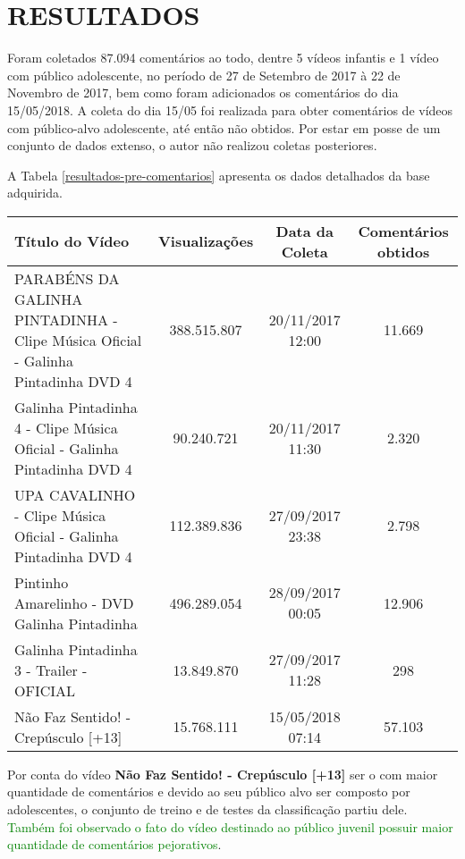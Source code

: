 \section{RESULTADOS}

Foram coletados 87.094 comentários ao todo, dentre 5 vídeos infantis e 1 vídeo com público adolescente, no período de 27 de Setembro de 2017 à 22 de Novembro de 2017, bem como foram adicionados os comentários do dia 15/05/2018. 
A coleta do dia 15/05 foi realizada para obter comentários de vídeos com público-alvo adolescente, até então não obtidos. Por estar em posse de um conjunto de dados extenso, o autor não realizou coletas posteriores. %

A Tabela \ref{resultados-pre-comentarios} apresenta os dados detalhados da base adquirida.

\begin{table}[H]
	
\begin{tabular}{|p{5.5cm}|c|c|c|}
\hline
\textbf{Título do Vídeo} & \textbf{Visualizações} & \textbf{Data da Coleta} & \textbf{Comentários obtidos} \\ \hline
PARABÉNS DA GALINHA PINTADINHA - Clipe Música Oficial - Galinha Pintadinha DVD 4 & 388.515.807 & 20/11/2017 12:00 & 11.669 \\ \hline
Galinha Pintadinha 4 - Clipe Música Oficial - Galinha Pintadinha DVD 4 & 90.240.721 & 20/11/2017 11:30 & 2.320 \\ \hline
UPA CAVALINHO - Clipe Música Oficial - Galinha Pintadinha DVD 4 & 112.389.836 & 27/09/2017 23:38 & 2.798 \\ \hline
Pintinho Amarelinho - DVD Galinha Pintadinha & 496.289.054 & 28/09/2017 00:05 & 12.906 \\ \hline
Galinha Pintadinha 3 - Trailer - OFICIAL & 13.849.870 & 27/09/2017 11:28 & 298 \\ \hline
Não Faz Sentido! - Crepúsculo [+13] & 15.768.111 & 15/05/2018 07:14 & 57.103 \\ \hline
\end{tabular}

\end{table}

Por conta do vídeo \textbf{Não Faz Sentido! - Crepúsculo [+13]} ser o com maior quantidade de comentários e devido ao seu público alvo ser composto por adolescentes, o conjunto de treino e de testes da classificação partiu dele. \textcolor{green}{Também foi observado o fato do vídeo destinado ao público juvenil possuir maior quantidade de comentários pejorativos}.

